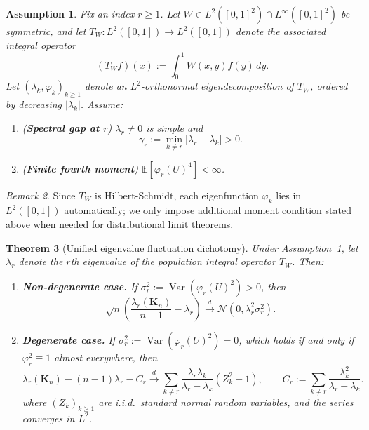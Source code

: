 \documentclass[11pt]{article}
\theoremstyle{plain}
\newtheorem{theorem}{Theorem}
\newtheorem{assumption}[theorem]{Assumption}
\theoremstyle{remark}
\newtheorem{remark}[theorem]{Remark}
\DeclareMathOperator{\Var}{Var}
\newcommand{\E}{\mathbb{E}}
\begin{document}
\begin{assumption}\label{ass:ustat}
Fix an index $r\ge1$. Let $W\in L^2([0,1]^2)\cap L^\infty([0,1]^2)$ be symmetric, 
and let $T_W:L^2([0,1])\to L^2([0,1])$ denote the associated integral operator
\[
(T_W f)(x) := \int_0^1 W(x,y) f(y)\,dy.
\]
Let $(\lambda_k, \varphi_k)_{k\ge1}$ denote an $L^2$-orthonormal eigendecomposition of $T_W$, 
ordered by decreasing $|\lambda_k|$. Assume:

\begin{enumerate}
\item (\textbf{Spectral gap at $r$}) $\lambda_r\neq 0$ is simple and
\[
\gamma_r:=\min_{k\neq r}|\lambda_r-\lambda_k|>0.
\]
\item (\textbf{Finite fourth moment}) $\E[\varphi_r(U)^4]<\infty$.

\end{enumerate}
\end{assumption}

\begin{remark}
Since $T_W$ is Hilbert-Schmidt, each eigenfunction $\varphi_k$ lies in $L^2([0,1])$ automatically;
we only impose additional moment condition stated above when needed for distributional limit theorems.
\end{remark}


\begin{theorem}[Unified eigenvalue fluctuation dichotomy]
\label{thm:ustat}
Under Assumption~\ref{ass:ustat}, let $\lambda_r$ denote the $r$th eigenvalue of the 
population integral operator $T_W$. Then:

\begin{enumerate}
\item \textbf{Non-degenerate case.}
If $\sigma_r^2 := \Var(\varphi_r(U)^2) > 0$, then
\[
\sqrt{n}\left(\frac{\lambda_r(\mathbf{K}_n)}{n-1}-\lambda_r\right)
\xrightarrow{d}
\mathcal{N}(0,\lambda_r^2\sigma_r^2).
\]

\item \textbf{Degenerate case.}
If $\sigma_r^2 := \Var(\varphi_r(U)^2) = 0$, which holds if and only if 
$\varphi_r^2 \equiv 1$ almost everywhere, then
\[
\lambda_r(\mathbf{K}_n) - (n-1)\lambda_r - C_r
\xrightarrow{d}
\sum_{k\neq r}\frac{\lambda_r\lambda_k}{\lambda_r-\lambda_k}(Z_k^2-1),
\qquad
C_r:=\sum_{k\neq r}\frac{\lambda_k^2}{\lambda_r-\lambda_k}.
\]
where $(Z_k)_{k\ge1}$ are i.i.d.\ standard normal random variables, and the series 
converges in $L^2$.
\end{enumerate}
\end{theorem}
\end{document}
